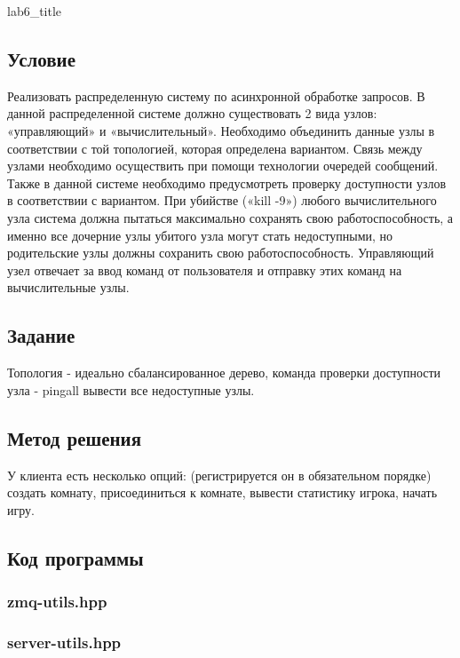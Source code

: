 \documentclass[12pt]{article}
\begin{document}
	
	{lab6_title}
	
	\subsection*{Условие}
	
	Реализовать распределенную систему по асинхронной обработке запросов. В данной
	распределенной системе должно существовать 2 вида узлов: «управляющий» и
	«вычислительный». Необходимо объединить данные узлы в соответствии с той топологией,
	которая определена вариантом. Связь между узлами необходимо осуществить при помощи
	технологии очередей сообщений. Также в данной системе необходимо предусмотреть проверку
	доступности узлов в соответствии с вариантом. При убийстве («kill -9») любого вычислительного
	узла система должна пытаться максимально сохранять свою работоспособность, а именно все
	дочерние узлы убитого узла могут стать недоступными, но родительские узлы должны сохранить
	свою работоспособность.
	Управляющий узел отвечает за ввод команд от пользователя и отправку этих команд на
	вычислительные узлы.
	
	\subsection*{Задание}
	
	Топология - идеально сбалансированное дерево, команда проверки доступности узла - pingall вывести все недоступные узлы.	
	
	\subsection*{Метод решения}
	
	У клиента есть несколько опций: (регистрируется он в обязательном порядке) создать комнату, присоединиться к комнате, вывести статистику игрока, начать игру. 
	
	\subsection*{Код программы}
	
	\subsubsection*{zmq-utils.hpp}
	
	
	
	\subsubsection*{server-utils.hpp}
	
\end{document}
